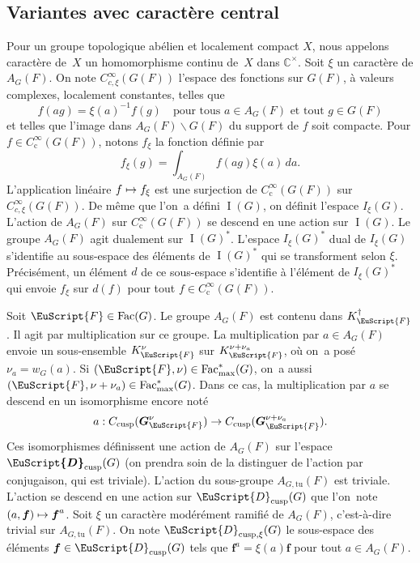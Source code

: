 \documentclass[JEP,XML,SOM,Unicode,francais]{cedram}
\let\mathcal \EuScript
\newcommand\mto{\mathchoice{\longmapsto}{\mapsto}{\mapsto}{\mapsto}}
\newcommand{\rc}{\mathrm{c}}
\newcommand{\cusp}{\mathrm{cusp}}
\newcommand{\Fac}{\mathrm{Fac}}
\newcommand{\tu}{\mathrm{tu}}
\DeclareMathOperator{\rI}{I}
\newcommand{\bmf}{\boldsymbol{f}}
\newcommand{\bG}{\boldsymbol{G}}
\newcommand{\cD}{\mathcal{D}}
\newcommand{\cF}{\mathcal{F}}
\newcommand{\CC}{\mathbb{C}}
\theoremstyle{plain}
\theoremstyle{definition}
\begin{document}
\subsection{Variantes avec caractère central}\label{varianteaveccaracterecentral}
Pour un groupe topologique abélien et localement compact $X$, nous appelons caractère de~$X$ un homomorphisme continu de~$X$ dans $\CC^{\times}$.
Soit $\xi$ un caractère de $A_{G}(F)$. On note $C_{c,\xi}^{\infty}(G(F))$ l'espace des fonctions sur $G(F)$, à valeurs complexes, localement constantes, telles que
\[
f(ag)=\xi(a)^{-1}f(g)\quad \text{pour tous $a\in A_{G}(F)$ et tout $g\in G(F)$}
\]
et telles que l'image dans $A_{G}(F)\backslash G(F)$ du support de $f$ soit compacte. Pour $f\in C_{\rc}^{\infty}(G(F))$, notons $f_{\xi}$ la fonction définie par
\[
f_{\xi}(g)=\int_{A_{G}(F)}f(ag)\xi(a)\,da.
\]
L'application linéaire $f\mto f_{\xi}$ est une surjection de $C_{\rc}^{\infty}(G(F))$ sur $ C_{c,\xi}^{\infty}(G(F))$. De même que l'on~a défini $\rI(G)$, on définit l'espace $I_{\xi}(G)$. L'action de $A_{G}(F)$ sur $C_{\rc}^{\infty}(G(F))$ se descend en une action sur $\rI(G)$. Le groupe $A_{G}(F)$ agit dualement sur $\rI(G)^*$. L'espace $I_{\xi}(G)^*$ dual de $I_{\xi}(G)$ s'identifie au sous-espace des éléments de $\rI(G)^*$ qui se transforment selon $\xi$. Précisément, un élément $d$ de ce sous-espace s'identifie à l'élément de $I_{\xi}(G)^*$ qui envoie $f_{\xi}$ sur $d(f)$ pour tout $f\in C_{\rc}^{\infty}(G(F))$.

Soit $\cF\in \Fac(G)$. Le groupe $A_{G}(F)$ est contenu dans $K_{\cF}^{\dag}$. Il agit par multiplication sur ce groupe. La multiplication par $a\in A_{G}(F)$ envoie un sous-ensemble $K_{\cF}^{\nu}$ sur $K_{\cF}^{\nu+\nu_{a}}$, où on~a posé $\nu_{a}=w_{G}(a)$. Si $(\cF,\nu)\in \Fac^*_{\max}(G)$, on~a aussi $(\cF,\nu+\nu_{a})\in \Fac^*_{\max}(G)$. Dans ce cas, la multiplication par $a$ se descend en un isomorphisme encore noté
\[
a:C_{\cusp}(\bG_{\cF}^{\nu})\to C_{\cusp}(\bG_{\cF}^{\nu+\nu_{a}}).
\]
Ces isomorphismes définissent une action de $A_{G}(F)$ sur l'espace $\boldsymbol{\cD}_{\cusp}(G)$ (on prendra soin de la distinguer de l'action par conjugaison, qui est triviale). L'action du sous-groupe $A_{G,\tu}(F)$ est triviale. L'action se descend en une action sur $\cD_{\cusp}(G)$ que l'on~note $(a,\bmf)\mto \bmf^{a}$. Soit $\xi$ un caractère modérément ramifié de $A_{G}(F)$, c'est-à-dire trivial sur $A_{G,\tu}(F)$. On note $\cD_{\cusp,\xi}(G)$ le sous-espace des éléments $\bmf\in \cD_{\cusp}(G)$ tels que $\bmf^{a}=\xi(a)\bmf$ pour tout $a\in A_{G}(F)$.
\end{document}
